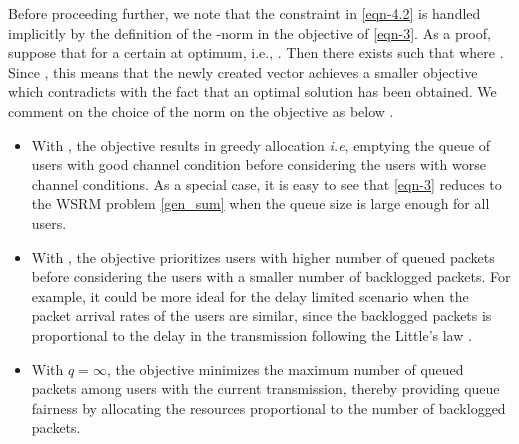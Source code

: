 Before proceeding further, we note that the constraint in \eqref{eqn-4.2} is handled implicitly by the definition of the -norm in the objective of \eqref{eqn-3}. As a proof, suppose that  for a certain  at optimum, i.e., . Then there exists  such that  where . Since , this means that the newly created vector  achieves a smaller objective which contradicts with the fact that an optimal solution has been obtained. We comment on the choice of  the norm  on the objective as below \cite{berry2004cross,qps_cioffi}.
\begin{itemize}
\item With , the objective results in greedy allocation \textit{i.e}, emptying the queue of users with good channel condition before considering the users with worse channel conditions. As a special case, it is easy to see that \eqref{eqn-3} reduces to the \ac{WSRM} problem \eqref{gen_sum} when the queue size is large enough for all users.
\item With , the objective prioritizes users with higher number of queued packets before considering the users with a smaller number of backlogged packets. For example, it could be more ideal for the delay limited scenario when the packet arrival rates of the users are similar, since the backlogged packets is proportional to the delay in the transmission following the Little's law \cite{neely2010stochastic}.
\item With \(q = \infty \), the objective minimizes the maximum number of queued packets among users with the current transmission, thereby providing queue fairness by allocating the resources proportional to the number of backlogged packets.
\end{itemize}
